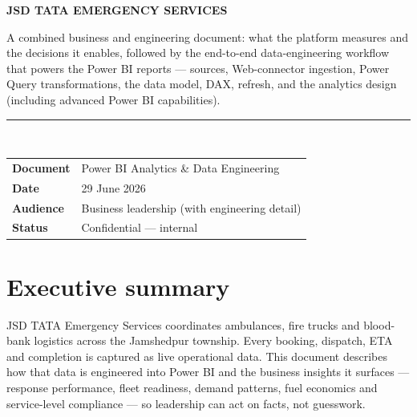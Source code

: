\documentclass[11pt,a4paper]{article}
\begin{document}
\begin{titlepage}
\noindent
\colorbox{accent}{\begin{minipage}[t][3.2cm][c]{\dimexpr\textwidth-2\fboxsep}
  \color{white}\hspace{4pt}
  {\footnotesize\textbf{\textsf{JSD TATA EMERGENCY SERVICES}}}\\[10pt]
\end{minipage}}

\vspace{6pt}

\vspace{2cm}
\noindent\color{ink}\small
A combined business and engineering document: what the platform measures and the
decisions it enables, followed by the end-to-end data-engineering workflow that powers
the Power BI reports --- sources, Web-connector ingestion, Power Query transformations,
the data model, DAX, refresh, and the analytics design (including advanced Power BI
capabilities).

\vfill
\noindent\textcolor{line}{\rule{\textwidth}{0.5pt}}\\[6pt]
\begin{tabular}{@{}ll@{}}
\textbf{Document} & Power BI Analytics \& Data Engineering \\
\textbf{Date} & 29 June 2026 \\
\textbf{Audience} & Business leadership (with engineering detail) \\
\textbf{Status} & Confidential --- internal \\
\end{tabular}
\end{titlepage}

\tableofcontents
\newpage

\section{Executive summary}
JSD TATA Emergency Services coordinates ambulances, fire trucks and blood-bank logistics
across the Jamshedpur township. Every booking, dispatch, ETA and completion is captured as
live operational data. This document describes how that data is engineered into Power BI and
the business insights it surfaces --- response performance, fleet readiness, demand patterns,
fuel economics and service-level compliance --- so leadership can act on facts, not guesswork.
\end{document}
